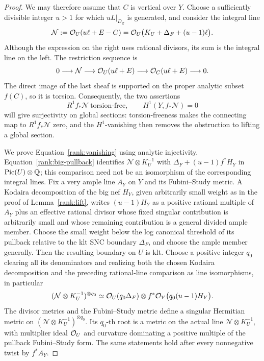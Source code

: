 \begin{proof}
We may therefore assume that \(C\) is vertical over \(Y\).
Choose a sufficiently divisible integer \(u>1\) for which
\(uL|_{D_Z}\) is generated, and consider the integral line
\begin{equation}
 \mathcal{N}
   :=\mathcal O_U(u\ell+E-C)
    =\mathcal O_U\bigl(K_U+\Delta_F+(u-1)\ell\bigr).
\label{rank:vanishing-line}
\end{equation}
Although the expression on the right uses rational divisors, its
sum is the integral line on the left.  The restriction sequence is
\[
 0\longrightarrow\mathcal{N}
 \longrightarrow\mathcal O_U(u\ell+E)
 \longrightarrow\mathcal O_C(u\ell+E)\longrightarrow0.
\]
The direct image of the last sheaf is supported on the proper analytic
subset \(f(C)\), so it is torsion.  Consequently, the two assertions
\begin{equation}
 R^1f_*\mathscr N\ \text{torsion-free},
             \qquad H^1(Y,f_*\mathscr N)=0
\label{rank:vanishing}
\end{equation}
will give surjectivity on global sections: torsion-freeness makes the
connecting map to \(R^1f_*\mathscr N\) zero, and the \(H^1\)-vanishing
then removes the obstruction to lifting a global section.

We prove Equation~\eqref{rank:vanishing} using analytic injectivity.
Equation~\eqref{rank:big-pullback} identifies
\(\mathscr N\otimes K_U^{-1}\) with
\(\Delta_F+(u-1)f^*H_Y\) in \(\operatorname{Pic}(U)\otimes\mathbb Q\); this comparison
need not be an isomorphism of the corresponding integral lines.  Fix a
very ample line \(A_Y\) on \(Y\) and its Fubini--Study metric.
A Kodaira decomposition of the big nef \(H_Y\), given arbitrarily
small weight as in the proof of Lemma~\ref{rank:lift}, writes
\((u-1)H_Y\) as a positive rational multiple of \(A_Y\) plus
an effective rational divisor whose fixed singular contribution
is arbitrarily small and whose remaining contribution is a
general divided ample member.  Choose the small weight below
the log canonical threshold of its pullback relative to the
klt SNC boundary \(\Delta_F\), and choose the ample member generally.
Then the resulting boundary on \(U\) is klt.  Choose a positive
integer \(q_0\) clearing all its denominators and realizing both the
chosen Kodaira decomposition and the preceding rational-line comparison
as line isomorphisms, in particular
\[
 (\mathcal{N}\otimes K_U^{-1})^{\otimes q_0}
 \simeq \mathcal O_U(q_0\Delta_F)\otimes
             f^*\mathcal O_Y\bigl(q_0(u-1)H_Y\bigr).
\]
The divisor metrics and the Fubini--Study metric
define a singular Hermitian metric on
\((\mathscr N\otimes K_U^{-1})^{\otimes q_0}\).  Its \(q_0\)-th
root is a metric on the actual line \(\mathscr N\otimes K_U^{-1}\),
with multiplier ideal \(\mathcal O_U\) and curvature dominating a positive
multiple of the pullback Fubini--Study form.  The same statements hold after every
nonnegative twist by \(f^*A_Y\).


\end{proof}

